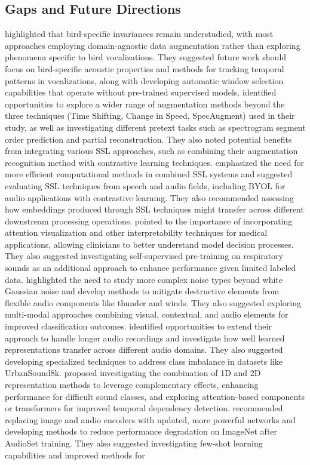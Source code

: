 \documentclass[11pt]{article}
\begin{document}
\subsection{Gaps and Future Directions}
\citep{moummad2024selfsupervisedlearningfewshotbird} highlighted that bird-specific invariances remain understudied, with most approaches employing domain-agnostic data augmentation rather than exploring phenomena specific to bird vocalizations. They suggested future work should focus on bird-specific acoustic properties and methods for tracking temporal patterns in vocalizations, along with developing automatic window selection capabilities that operate without pre-trained supervised models. \citep{TRIPATHI2021108183} identified opportunities to explore a wider range of augmentation methods beyond the three techniques (Time Shifting, Change in Speed, SpecAugment) used in their study, as well as investigating different pretext tasks such as spectrogram segment order prediction and partial reconstruction. They also noted potential benefits from integrating various SSL approaches, such as combining their augmentation recognition method with contrastive learning techniques.\citep{wilkinghoff2023selfsupervisedlearninganomaloussound} emphasized the need for more efficient computational methods in combined SSL systems and suggested evaluating SSL techniques from speech and audio fields, including BYOL for audio applications with contrastive learning. They also recommended assessing how embeddings produced through SSL techniques might transfer across different downstream processing operations. \citep{Bae_2023} pointed to the importance of incorporating attention visualization and other interpretability techniques for medical applications, allowing clinicians to better understand model decision processes. They also suggested investigating self-supervised pre-training on respiratory sounds as an additional approach to enhance performance given limited labeled data. \citep{app14219711} highlighted the need to study more complex noise types beyond white Gaussian noise and develop methods to mitigate destructive elements from flexible audio components like thunder and winds. They also suggested exploring multi-modal approaches combining visual, contextual, and audio elements for improved classification outcomes. \citep{CHEN2025110593} identified opportunities to extend their approach to handle longer audio recordings and investigate how well learned representations transfer across different audio domains. They also suggested developing specialized techniques to address class imbalance in datasets like UrbanSound8k.\citep{abdoli2019endtoendenvironmentalsoundclassification} proposed investigating the combination of 1D and 2D representation methods to leverage complementary effects, enhancing performance for difficult sound classes, and exploring attention-based components or transformers for improved temporal dependency detection. \citep{guzhov2021audioclipextendingclipimage} recommended replacing image and audio encoders with updated, more powerful networks and developing methods to reduce performance degradation on ImageNet after AudioSet training. They also suggested investigating few-shot learning capabilities and improved methods for 
\end{document}
